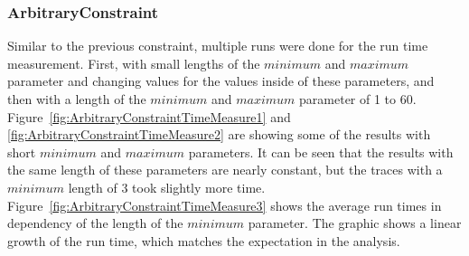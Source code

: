 \subsubsection{ArbitraryConstraint}
	Similar to the previous constraint, multiple runs were done for the run time measurement. First, with small lengths of the $minimum$ and $maximum$ parameter and changing values for the values inside of these parameters, and then with a length of the $minimum$ and $maximum$ parameter of 1 to 60. Figure~\ref{fig:ArbitraryConstraintTimeMeasure1} and \ref{fig:ArbitraryConstraintTimeMeasure2} are showing some of the results with short $minimum$ and $maximum$ parameters. It can be seen that the results with the same length of these parameters are nearly constant, but the traces with a $minimum$ length of 3 took slightly more time. Figure~\ref{fig:ArbitraryConstraintTimeMeasure3} shows the average run times in dependency of the length of the $minimum$ parameter. The graphic shows a linear growth of the run time, which matches the expectation in the analysis.
